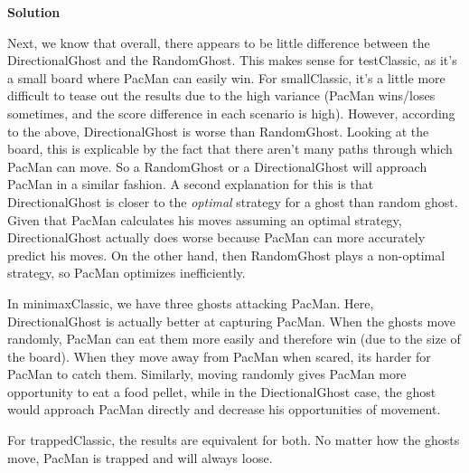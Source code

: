 \documentclass[11pt]{article}
\newcounter{AnswerCounter}
\newcounter{SubAnswerCounter}
\newenvironment{answer}[0]{
  \setcounter{SubAnswerCounter}{1}
  \bigskip
  \textbf{Solution \arabic{AnswerCounter}}
  \\
  \begin{small}
}{
  \end{small}
  \stepcounter{AnswerCounter}
}
\begin{document}
\begin{answer}
Next, we know that overall, there appears to be little difference between the DirectionalGhost and the RandomGhost. This makes sense for testClassic, as it's a small board where PacMan can easily win. For smallClassic, it's a little more difficult to tease out the results due to the high variance (PacMan wins/loses sometimes, and the score difference in each scenario is high). However, according to the above, DirectionalGhost is worse than RandomGhost. Looking at the board, this is explicable by the fact that there aren't many paths through which PacMan can move. So a RandomGhost or a DirectionalGhost will approach PacMan in a similar fashion. A second explanation for this is that DirectionalGhost is closer to the \textit{optimal} strategy for a ghost than random ghost. Given that PacMan calculates his moves assuming an optimal strategy, DirectionalGhost actually does worse because PacMan can more accurately predict his moves. On the other hand, then RandomGhost plays a non-optimal strategy, so PacMan optimizes inefficiently.

In minimaxClassic, we have three ghosts attacking PacMan. Here, DirectionalGhost is actually better at capturing PacMan. When the ghosts move randomly, PacMan can eat them more easily and therefore win (due to the size of the board). When they move away from PacMan when scared, its harder for PacMan to catch them. Similarly, moving randomly gives PacMan more opportunity to eat a food pellet, while in the DiectionalGhost case, the ghost would approach PacMan directly and decrease his opportunities of movement.

For trappedClassic, the results are equivalent for both. No matter how the ghosts move, PacMan is trapped and will always loose.

\end{answer}
\end{document}
